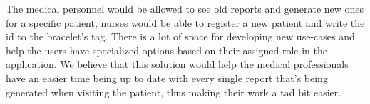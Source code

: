 The medical personnel would be allowed to see old reports and generate new ones for a specific patient, nurses would be able to register a new patient and write the id to the bracelet's tag. There is a lot of space for developing new use-cases and help the users have specialized options based on their assigned role in the application. We believe that this solution would help the medical professionals have an easier time being up to date with every single report that's being generated when visiting the patient, thus making their work a tad bit easier.